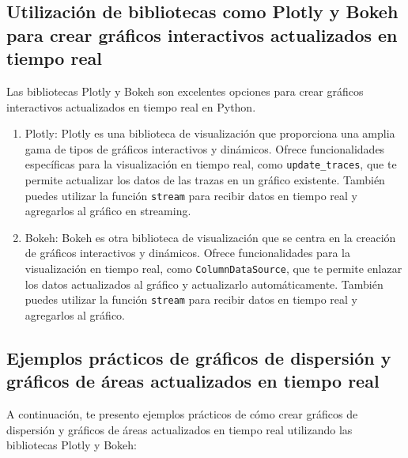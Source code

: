 \documentclass[
  a4paper,
]{article}
\begin{document}
\hypertarget{utilizaciuxf3n-de-bibliotecas-como-plotly-y-bokeh-para-crear-gruxe1ficos-interactivos-actualizados-en-tiempo-real}{%
\subsection{Utilización de bibliotecas como Plotly y Bokeh para crear
gráficos interactivos actualizados en tiempo
real}\label{utilizaciuxf3n-de-bibliotecas-como-plotly-y-bokeh-para-crear-gruxe1ficos-interactivos-actualizados-en-tiempo-real}}

Las bibliotecas Plotly y Bokeh son excelentes opciones para crear
gráficos interactivos actualizados en tiempo real en Python.

\begin{enumerate}
\def\labelenumi{\arabic{enumi}.}
\item
  Plotly: Plotly es una biblioteca de visualización que proporciona una
  amplia gama de tipos de gráficos interactivos y dinámicos. Ofrece
  funcionalidades específicas para la visualización en tiempo real, como
  \texttt{update\_traces}, que te permite actualizar los datos de las
  trazas en un gráfico existente. También puedes utilizar la función
  \texttt{stream} para recibir datos en tiempo real y agregarlos al
  gráfico en streaming.
\item
  Bokeh: Bokeh es otra biblioteca de visualización que se centra en la
  creación de gráficos interactivos y dinámicos. Ofrece funcionalidades
  para la visualización en tiempo real, como \texttt{ColumnDataSource},
  que te permite enlazar los datos actualizados al gráfico y
  actualizarlo automáticamente. También puedes utilizar la función
  \texttt{stream} para recibir datos en tiempo real y agregarlos al
  gráfico.
\end{enumerate}

\hypertarget{ejemplos-pruxe1cticos-de-gruxe1ficos-de-dispersiuxf3n-y-gruxe1ficos-de-uxe1reas-actualizados-en-tiempo-real}{%
\subsection{Ejemplos prácticos de gráficos de dispersión y gráficos de
áreas actualizados en tiempo
real}\label{ejemplos-pruxe1cticos-de-gruxe1ficos-de-dispersiuxf3n-y-gruxe1ficos-de-uxe1reas-actualizados-en-tiempo-real}}

A continuación, te presento ejemplos prácticos de cómo crear gráficos de
dispersión y gráficos de áreas actualizados en tiempo real utilizando
las bibliotecas Plotly y Bokeh:
\end{document}
